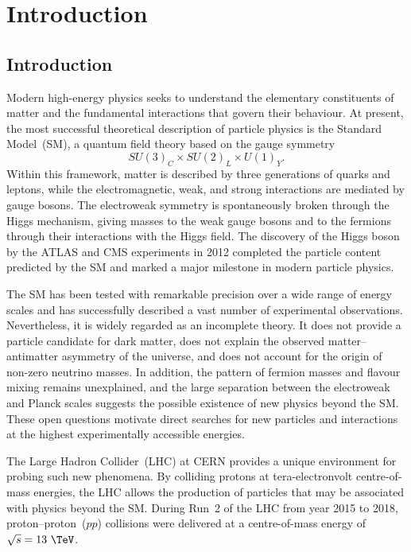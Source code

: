 \chapter{Introduction}
\label{chapter1:introduction}
\section{Introduction}

Modern high-energy physics seeks to understand the elementary constituents of matter and the fundamental interactions that govern their behaviour. 
At present, the most successful theoretical description of particle physics is the Standard Model~(SM), a quantum field theory based on the gauge symmetry
\begin{equation}
    SU(3)_{C} \times SU(2)_{L} \times U(1)_{Y}.
\end{equation}
Within this framework, matter is described by three generations of quarks and leptons, while the electromagnetic, weak, and strong interactions are mediated by gauge bosons. 
The electroweak symmetry is spontaneously broken through the Higgs mechanism, giving masses to the weak gauge bosons and to the fermions through their interactions with the Higgs field. 
The discovery of the Higgs boson by the ATLAS and CMS experiments in 2012 completed the particle content predicted by the SM and marked a major milestone in modern particle physics.

The SM has been tested with remarkable precision over a wide range of energy scales and has successfully described a vast number of experimental observations. 
Nevertheless, it is widely regarded as an incomplete theory. 
It does not provide a particle candidate for dark matter, does not explain the observed matter--antimatter asymmetry of the universe, and does not account for the origin of non-zero neutrino masses. 
In addition, the pattern of fermion masses and flavour mixing remains unexplained, and the large separation between the electroweak and Planck scales suggests the possible existence of new physics beyond the SM. 
These open questions motivate direct searches for new particles and interactions at the highest experimentally accessible energies.

The Large Hadron Collider~(LHC) at CERN provides a unique environment for probing such new phenomena. 
By colliding protons at tera-electronvolt centre-of-mass energies, the LHC allows the production of particles that may be associated with physics beyond the SM. 
During Run~2 of the LHC from year 2015 to 2018, proton--proton~($pp$) collisions were delivered at a centre-of-mass energy of $\sqrt{s} = 13~\TeV$.

